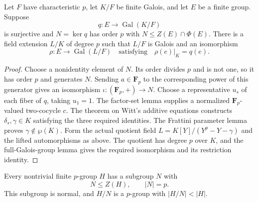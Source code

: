\begin{theorem}
\label{thm:witt-central-frattini-lift}
\leanok
Let $F$ have characteristic $p$, let $K/F$ be finite Galois,
and let $E$ be a finite group. Suppose
\[
 q:E\longrightarrow\operatorname{Gal}(K/F)
\]
is surjective and $N=\ker q$ has order $p$ with
$N\le Z(E)\cap\Phi(E)$.
There is a field extension $L/K$ of degree $p$ such that
$L/F$ is Galois and an isomorphism
\[
 \rho:E\longrightarrow\operatorname{Gal}(L/F)
 \quad\text{satisfying}\quad\rho(e)|_K=q(e).
\]
\end{theorem}

\begin{proof}
Choose a nonidentity element of $N$. Its order divides $p$
and is not one, so it has order $p$ and generates $N$.
Sending $a\in\mathbf F_p$ to the corresponding power of this
generator gives an isomorphism $\iota:(\mathbf F_p,+)\to N$.
Choose a representative $u_s$ of each fiber of $q$, taking
$u_1=1$. The factor-set lemma supplies a normalized
$\mathbf F_p$-valued two-cocycle $c$.
The theorem on Witt's additive equations constructs
$\delta_s,\gamma\in K$ satisfying the three required
identities. The Frattini parameter lemma proves
$\gamma\notin\wp(K)$.
Form the actual quotient field
$L=K[Y]/(Y^p-Y-\gamma)$ and the lifted automorphisms as above.
The quotient has degree $p$ over $K$, and the full-Galois-group
lemma gives the required isomorphism and its restriction
identity.
\end{proof}


\begin{lemma}
\label{lem:finite-p-group-central-prime-step}
\leanok
Every nontrivial finite $p$-group $H$ has a subgroup $N$ with
\[
 N\le Z(H),\qquad |N|=p.
\]
This subgroup is normal, and $H/N$ is a $p$-group with
$|H/N|<|H|$.
\end{lemma}

